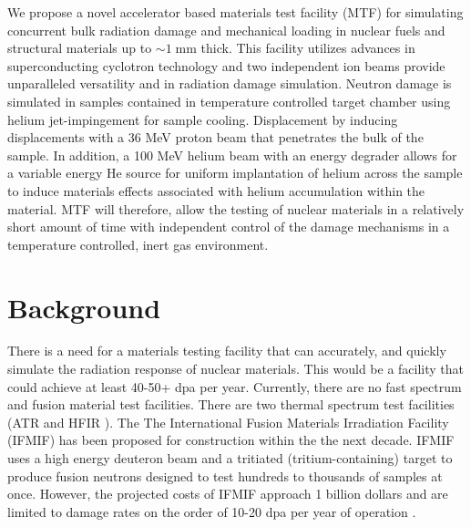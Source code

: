 \documentclass[final,3p,times,twocolumn]{elsarticle} %
\begin{document}

We propose a novel accelerator based materials test facility (MTF) for simulating concurrent bulk radiation damage and mechanical loading in nuclear fuels and structural materials up to $\sim 1\;\mathrm{mm}$ thick.  This facility utilizes advances in superconducting cyclotron technology and two independent ion beams provide unparalleled versatility and in radiation damage simulation.  Neutron damage is simulated in samples contained in temperature controlled target chamber using helium jet-impingement for sample cooling.  Displacement by inducing displacements with a 36 MeV proton beam that penetrates the bulk of the sample.  In addition, a 100 MeV helium beam with an energy degrader allows for a variable energy He source for uniform implantation of helium across the sample to induce materials effects associated with helium accumulation within the material.  MTF will therefore, allow the testing of nuclear materials in a relatively short amount of time with independent control of the damage mechanisms in a temperature controlled, inert gas environment.

\section{Background}

There is a need for a materials testing facility that can accurately, and quickly simulate the radiation response of nuclear materials. This would be a facility that could achieve at least 40-50+ dpa per year. Currently, there are no fast spectrum and fusion material test facilities. There are two thermal spectrum test facilities (ATR \cite{?} and HFIR \cite{lucas1990review}). The The International Fusion Materials Irradiation Facility (IFMIF) has been proposed for construction within the the next decade. IFMIF uses a high energy deuteron beam and a tritiated (tritium-containing) target to produce fusion neutrons designed to test hundreds to thousands of samples at once. However, the projected costs of IFMIF approach 1 billion dollars and are limited to damage rates on the order of 10-20 dpa per year of operation \cite{?}.
\end{document}
